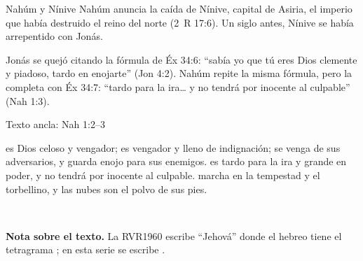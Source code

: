 \begin{frame}{Nahúm y Nínive}
\small Nahúm anuncia la caída de Nínive, capital de Asiria, el imperio que había destruido el reino del norte (2~R 17:6). Un siglo antes, Nínive se había arrepentido con Jonás.
\par\medskip
\centering
{}\par\medskip
\RaggedRight Jonás se quejó citando la fórmula de Éx 34:6: ``sabía yo que tú eres Dios clemente y piadoso, tardo en enojarte'' (Jon 4:2). Nahúm repite la misma fórmula, pero la completa con Éx 34:7: ``tardo para la ira\ldots{} y no tendrá por inocente al culpable'' (Nah 1:3).
\par\smallskip{}
\end{frame}

\begin{frame}{Texto ancla: Nah 1:2--3}
\begin{cita}\SENOR{} es Dios celoso y vengador; \SENOR{} es vengador y lleno de indignación; se venga de sus adversarios, y guarda enojo para sus enemigos. \SENOR{} es tardo para la ira y grande en poder, y no tendrá por inocente al culpable. \SENOR{} marcha en la tempestad y el torbellino, y las nubes son el polvo de sus pies.\end{cita}
\begin{center}
\\[2pt]
\end{center}
\footnotesize\textbf{Nota sobre el texto.} La RVR1960 escribe ``Jehová'' donde el hebreo tiene el tetragrama ; en esta serie se escribe \SENOR.
\end{frame}

